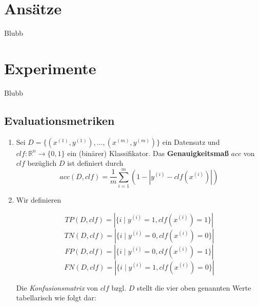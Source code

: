 \documentclass[researchlab,palatino]{AIGpaper}
\begin{document}
\section{Ansätze}
Blubb

\section{Experimente}
Blubb
\subsection{Evaluationsmetriken}
\begin{enumerate}
    \item 
Sei $D = \{(x^{(1)}, y^{(1)}), \dots, (x^{(m)}, y^{(m)})\}$ ein Datensatz und $clf: \mathbb{R}^n \to \{0, 1\}$ ein (binärer) Klassifikator. Das \textbf{Genauigkeitsmaß} $acc$ von $clf$ bezüglich $D$ ist definiert durch
\begin{equation}
    acc(D, clf) = \frac{1}{m} \sum_{i=1}^{m} \left(1 - \left|y^{(i)} - clf(x^{(i)})\right|\right)
\end{equation}
    
\item 
Wir definieren

\begin{equation}
    TP(D, clf) = |\{i \mid y^{(i)} = 1, clf(x^{(i)}) = 1\}|
\end{equation}
\begin{equation}
    TN(D, clf) = |\{i \mid y^{(i)} = 0, clf(x^{(i)}) = 0\}|
\end{equation}
\begin{equation}
    FP(D, clf) = |\{i \mid y^{(i)} = 0, clf(x^{(i)}) = 1\}|
\end{equation}
\begin{equation}
    FN(D, clf) = |\{i \mid y^{(i)} = 1, clf(x^{(i)}) = 0\}|
\end{equation}

Die \textit{Konfusionsmatrix} von $clf$ bzgl. $D$ stellt die vier oben genannten Werte tabellarisch wie folgt dar:


\end{enumerate}
\end{document}
